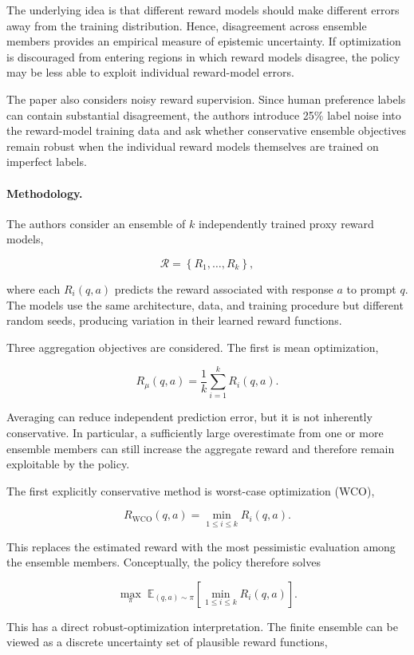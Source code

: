 \documentclass[11pt]{article}
\begin{document}
The underlying idea is that different reward models should make different errors away from the training distribution. Hence, disagreement across ensemble members provides an empirical measure of epistemic uncertainty. If optimization is discouraged from entering regions in which reward models disagree, the policy may be less able to exploit individual reward-model errors.

The paper also considers noisy reward supervision. Since human preference labels can contain substantial disagreement, the authors introduce 25\% label noise into the reward-model training data and ask whether conservative ensemble objectives remain robust when the individual reward models themselves are trained on imperfect labels.

\paragraph{Methodology.}

The authors consider an ensemble of $k$ independently trained proxy reward models,

\[
\mathcal{R}
=
\left\{
R_1,\ldots,R_k
\right\},
\]

where each $R_i(q,a)$ predicts the reward associated with response $a$ to prompt $q$. The models use the same architecture, data, and training procedure but different random seeds, producing variation in their learned reward functions.

Three aggregation objectives are considered. The first is mean optimization,

\[
R_{\mu}(q,a)
=
\frac{1}{k}
\sum_{i=1}^{k}
R_i(q,a).
\]

Averaging can reduce independent prediction error, but it is not inherently conservative. In particular, a sufficiently large overestimate from one or more ensemble members can still increase the aggregate reward and therefore remain exploitable by the policy.

The first explicitly conservative method is worst-case optimization (WCO),

\[
R_{\mathrm{WCO}}(q,a)
=
\min_{1\leq i\leq k}
R_i(q,a).
\]

This replaces the estimated reward with the most pessimistic evaluation among the ensemble members. Conceptually, the policy therefore solves

\[
\max_{\pi}
\;
\mathbb{E}_{(q,a)\sim\pi}
\left[
\min_{1\leq i\leq k}
R_i(q,a)
\right].
\]

This has a direct robust-optimization interpretation. The finite ensemble can be viewed as a discrete uncertainty set of plausible reward functions,
\end{document}
